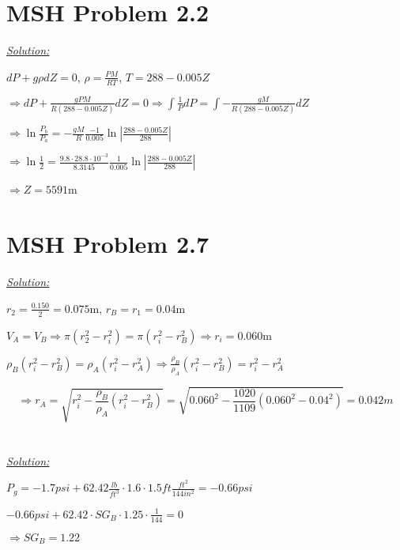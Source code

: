 \documentclass{homework}
\begin{document}
\section{MSH Problem 2.2}

\textit{\underline{Solution:}}

$dP + g\rho dZ = 0$, \quad $\rho = \displaystyle \frac{PM}{RT}$, \quad $T = 288-0.005Z$
\vspace{1.2ex}

$\Rightarrow dP + \displaystyle \frac{gPM}{R(288-0.005Z)} dZ = 0 \Rightarrow
\int \frac{1}{P} dP = \int -\frac{gM}{R(288-0.005Z)} dZ$
\vspace{1.2ex}

$\Rightarrow \ln \displaystyle \frac{P_b}{P_a} = -\frac{gM}{R} \frac{-1}{0.005} \ln\left\lvert\frac{288-0.005Z}{288}\right\rvert$
\vspace{1.2ex}

$\Rightarrow \ln \displaystyle \frac{1}{2} = \frac{9.8 \cdot 28.8 \cdot 10^{-3}}{8.3145} \frac{1}{0.005} \ln\left\lvert\frac{288-0.005Z}{288}\right\rvert$
\vspace{1.2ex}

$\Rightarrow Z = 5591$m

\section{MSH Problem 2.7}

\textit{\underline{Solution:}}

$r_2 = \displaystyle \frac{0.150}{2} = 0.075$m, \quad $r_B = r_1 = 0.04$m
\vspace{1.2ex}

$V_A = V_B \Rightarrow \pi(r_2^2 - r_i^2) = \pi (r_i^2 - r_B^2)\Rightarrow r_i = 0.060$m
\vspace{1.2ex}

$\rho_B(r_i^2-r_B^2) = \rho_A(r_i^2-r_A^2) \Rightarrow \displaystyle \frac{\rho_B}{\rho_A}(r_i^2 - r_B^2) = r_i^2 - r_A^2$

\begin{displaymath}
	\Rightarrow r_A = \sqrt{r_i^2 - \frac{\rho_B}{\rho_A} (r_i^2 - r_B^2)} = \sqrt{0.060^2 - \frac{1020}{1109} (0.060^2 - 0.04^2)} = 0.042 m
\end{displaymath}

\section{}

\textit{\underline{Solution:}}

$P_g = -1.7psi + 62.42\displaystyle \frac{lb}{ft^3} \cdot 1.6 \cdot 1.5 ft \frac{ft^2}{144in^2} = -0.66psi$
\vspace{1.2ex}

$-0.66psi + 62.42 \cdot SG_B \cdot 1.25 \cdot \displaystyle\frac{1}{144} = 0$
\vspace{1.2ex}

$\Rightarrow SG_B=1.22$
\end{document}

